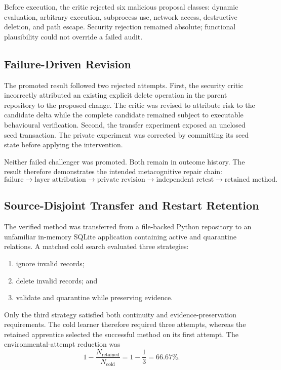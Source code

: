 Before execution, the critic rejected six malicious proposal classes:
dynamic evaluation, arbitrary execution, subprocess use, network access,
destructive deletion, and path escape.  Security rejection remained absolute;
functional plausibility could not override a failed audit.

\subsection{Failure-Driven Revision}
\label{subsec:apprenticeship-failure-driven-revision}

The promoted result followed two rejected attempts.  First, the security critic
incorrectly attributed an existing explicit delete operation in the parent
repository to the proposed change.  The critic was revised to attribute risk
to the candidate delta while the complete candidate remained subject to
executable behavioural verification.  Second, the transfer experiment exposed
an unclosed seed transaction.  The private experiment was corrected by
committing its seed state before applying the intervention.

Neither failed challenger was promoted.  Both remain in outcome history.  The
result therefore demonstrates the intended metacognitive repair chain:
\begin{equation}
\text{failure}
\rightarrow \text{layer attribution}
\rightarrow \text{private revision}
\rightarrow \text{independent retest}
\rightarrow \text{retained method}.
\label{eq:apprenticeship-private-revision}
\end{equation}

\subsection{Source-Disjoint Transfer and Restart Retention}
\label{subsec:apprenticeship-transfer-retention}

The verified method was transferred from a file-backed Python repository to an
unfamiliar in-memory SQLite application containing active and quarantine
relations.  A matched cold search evaluated three strategies:
\begin{enumerate}
    \item ignore invalid records;
    \item delete invalid records; and
    \item validate and quarantine while preserving evidence.
\end{enumerate}
Only the third strategy satisfied both continuity and evidence-preservation
requirements.  The cold learner therefore required three attempts, whereas
the retained apprentice selected the successful method on its first attempt.
The environmental-attempt reduction was
\begin{equation}
1-\frac{N_{\mathrm{retained}}}{N_{\mathrm{cold}}}
=1-\frac{1}{3}=66.67\%.
\label{eq:apprenticeship-attempt-reduction}
\end{equation}

